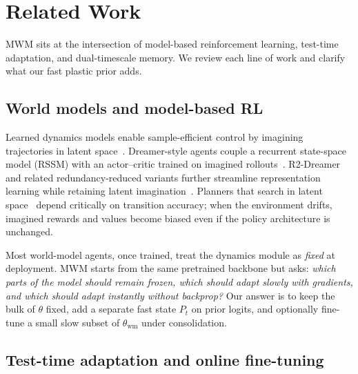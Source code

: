 
\section{Related Work}
\label{sec:related}

MWM sits at the intersection of model-based reinforcement learning, test-time adaptation, and dual-timescale memory.
We review each line of work and clarify what our fast plastic prior adds.

\subsection{World models and model-based RL}
\label{sec:related-wm}

Learned dynamics models enable sample-efficient control by imagining trajectories in latent space~\cite{hafner2019learning,hafner2020dream,ha2018world}.
Dreamer-style agents couple a recurrent state-space model (RSSM) with an actor--critic trained on imagined rollouts~\cite{hafner2020dream,hafner2023mastering}.
R2-Dreamer and related redundancy-reduced variants further streamline representation learning while retaining latent imagination~\cite{hafner2023mastering}.
Planners that search in latent space~\cite{hafner2019learning,okada2021dreaming} depend critically on transition accuracy; when the environment drifts, imagined rewards and values become biased even if the policy architecture is unchanged.

Most world-model agents, once trained, treat the dynamics module as \emph{fixed} at deployment.
MWM starts from the same pretrained backbone but asks: \emph{which parts of the model should remain frozen, which should adapt slowly with gradients, and which should adapt instantly without backprop?}
Our answer is to keep the bulk of $\theta$ fixed, add a separate fast state $P_t$ on prior logits, and optionally fine-tune a small slow subset of $\theta_{\mathrm{wm}}$ under consolidation.

\subsection{Test-time adaptation and online fine-tuning}
\label{sec:related-tta}

